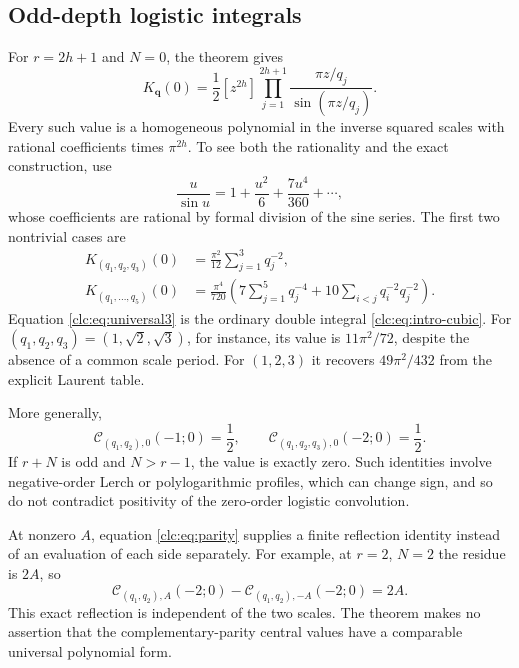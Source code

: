 \documentclass[11pt,a4paper]{article}
\numberwithin{equation}{section}
\theoremstyle{definition}\newtheorem{definition}[theorem]{Definition}
\theoremstyle{remark}\newtheorem{remark}[theorem]{Remark}
\newcommand{\bq}{\boldsymbol q}\newcommand{\bs}{\boldsymbol s}
\newcommand{\CC}{\mathcal C}\newcommand{\UU}{\mathcal U}\newcommand{\EE}{\mathcal E}
\begin{document}
\subsection{Odd-depth logistic integrals}
For $r=2h+1$ and $N=0$, the theorem gives
\begin{equation}\label{clc:eq:odd-depth}
 K_{\bq}(0)=\frac12[z^{2h}]
                   \prod_{j=1}^{2h+1}\frac{\pi z/q_j}{\sin(\pi z/q_j)}.
\end{equation}
Every such value is a homogeneous polynomial in the inverse squared
scales with rational coefficients times $\pi^{2h}$.
To see both the rationality and the exact construction, use
\[
 \frac{u}{\sin u}=1+\frac{u^2}{6}+\frac{7u^4}{360}+\cdots,
\]
whose coefficients are rational by formal division of the sine series.
The first two nontrivial cases are
\begin{align}
 K_{(q_1,q_2,q_3)}(0)
   &=\frac{\pi^2}{12}\sum_{j=1}^3q_j^{-2},
 \label{clc:eq:universal3}\\
 K_{(q_1,\ldots,q_5)}(0)
   &=\frac{\pi^4}{720}
       \left(7\sum_{j=1}^5q_j^{-4}
               +10\sum_{i<j}q_i^{-2}q_j^{-2}\right).
 \label{clc:eq:universal5}
\end{align}
Equation \eqref{clc:eq:universal3} is the ordinary double integral
\eqref{clc:eq:intro-cubic}. For $(q_1,q_2,q_3)=(1,\sqrt2,\sqrt3)$,
for instance, its value is $11\pi^2/72$, despite the absence of a
common scale period. For $(1,2,3)$ it recovers $49\pi^2/432$ from the
explicit Laurent table.

More generally,
\begin{equation}\label{clc:eq:negative-examples}
 \CC_{(q_1,q_2),0}(-1;0)=\frac12,\qquad
 \CC_{(q_1,q_2,q_3),0}(-2;0)=\frac12.
\end{equation}
If $r+N$ is odd and $N>r-1$, the value is exactly zero.
Such identities involve negative-order Lerch or polylogarithmic
profiles, which can change sign, and so do not contradict positivity
of the zero-order logistic convolution.

At nonzero $A$, equation \eqref{clc:eq:parity} supplies a finite
reflection identity instead of an evaluation of each side separately.
For example, at $r=2$, $N=2$ the residue is $2A$, so
\[
 \CC_{(q_1,q_2),A}(-2;0)-\CC_{(q_1,q_2),-A}(-2;0)=2A.
\]
This exact reflection is independent of the two scales. The theorem
makes no assertion that the complementary-parity central values have
a comparable universal polynomial form.

\end{document}

